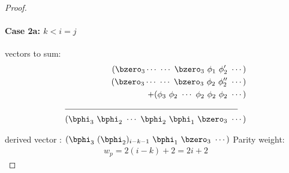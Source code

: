 \documentclass[11pt, oneside, dvipdfmx]{book}
\begin{document}
\begin{proof}
\newpage
\paragraph{Case 2a: $k<i=j$ \newline}
 vectors to sum:
\begin{align*}
(\bzero_3\cdots~\cdots~\bzero_3~\phi_1~\phi'_2~\cdots)\\
(\bzero_3\cdots~\cdots~\bzero_3~\phi_2~\phi''_2~\cdots)\\
+(\phi_3~\phi_2~\cdots~\phi_2~\phi_2~\phi_2~\cdots)\\
\cline{1-2}
(\bphi_3~\bphi_2~\cdots~\bphi_2~\bphi_1~\bzero_3~\cdots)
\end{align*}


derived vector : $(\bphi_3~(\bphi_2)_{i-k-1}~\bphi_1~\bzero_3~\cdots)$
\newline
Parity weight: \begin{equation}
\begin{split}
w_p=2(i-k)+2 =2i+2
\end{split}
\end{equation}



\end{proof}
\end{document}
